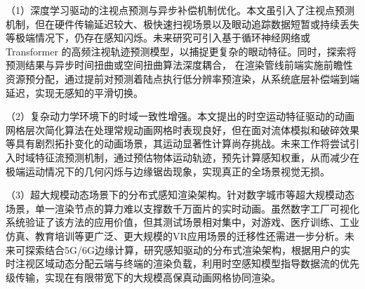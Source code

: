 （1）深度学习驱动的注视点预测与异步补偿机制优化。本文虽引入了注视点预测机制，但在硬件传输延迟较大、极快速扫视场景以及眼动追踪数据短暂或持续丢失等极端情况下，仍存在感知闪烁。未来研究可引入基于循环神经网络或 Transformer 的高频注视轨迹预测模型，以捕捉更复杂的眼动特征。同时，探索将预测结果与异步时间扭曲或空间扭曲算法深度耦合， 在渲染管线前端实施前瞻性资源预分配，通过提前对预测着陆点执行低分辨率预渲染，从系统底层补偿端到端延迟，实现无感知的平滑切换。

（2）复杂动力学环境下的时域一致性增强。本文提出的时空运动特征驱动的动画网格层次简化算法在处理常规动画网格时表现良好，但在面对流体模拟和破碎效果等具有剧烈拓扑变化的动画场景，其运动显著性计算尚存挑战。未来工作将尝试引入时域特征流预测机制，通过预估物体运动轨迹，预先计算感知权重，从而减少在极端运动情况下的几何闪烁与边缘锯齿现象，实现真正的全场景视觉无损。

（3）超大规模动态场景下的分布式感知渲染架构。针对数字城市等超大规模动态场景，单一渲染节点的算力难以支撑数千万面片的实时动画。虽然数字工厂可视化系统验证了该方法的应用价值，但其测试场景相对集中，对游戏、医疗训练、工业仿真、教育培训等更广泛、更大规模的VR应用场景的迁移性还需进一步分析。未来可探索结合5G/6G边缘计算，研究感知驱动的分布式渲染架构，根据用户的实时注视区域动态分配云端与终端的渲染负载，利用时空感知模型指导数据流的优先级传输，实现在有限带宽下的大规模高保真动画网格协同渲染。